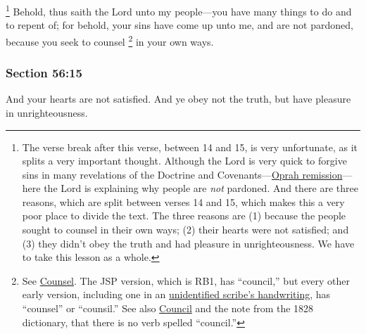 			\footnote{%
				The verse break after this verse, between 14 and 15, is very unfortunate, as it splits a very important thought. Although the Lord is very quick to forgive sins in many revelations of the Doctrine and Covenants---\href{https://climbingtherainbows.substack.com/p/gospel-constructs-and-oprah}{Oprah remission}---here the Lord is explaining why people are \textit{not} pardoned. And there are three reasons, which are split between verses 14 and 15, which makes this a very poor place to divide the text. The three reasons are (1) because the people sought to counsel in their own ways; (2) their hearts were not satisfied; and (3) they didn't obey the truth and had pleasure in unrighteousness. We have to take this lesson as a whole.
				}%
		Behold, thus saith the Lord unto my people---you have many things to do and to repent of; for behold, your sins have come up unto me, and are not pardoned, because you seek to counsel%
			\footnote{%
				See \hyperref[COUNSEL]{Counsel}. The JSP version, which is RB1, has ``council,'' but every other early version, including one in an \href{https://www.josephsmithpapers.org/paper-summary/revelation-15-june-1831-unidentified-scribe-copy-dc-56/1}{unidentified scribe's handwriting}, has ``counsel'' or ``counsil.'' See also \hyperref[COUNCIL]{Council} and the note from the 1828 dictionary, that there is no verb spelled ``council.''
				}
		in your own ways.


	\subsubsection{Section 56:15} %
		\label{DC56-15}

		And your hearts are not satisfied. And ye obey not the truth, but have pleasure in unrighteousness.


